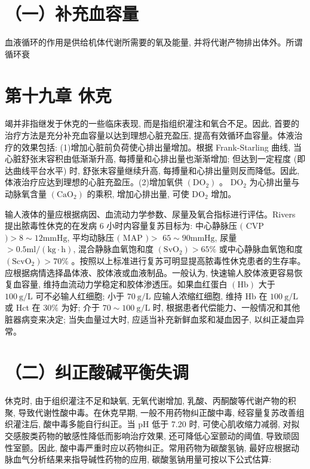 \documentclass[10pt]{article}
\begin{document}
\section*{（一）补充血容量}
血液循环的作用是供给机体代谢所需要的氧及能量, 并将代谢产物排出体外。所谓循环衰

\section*{第十九章 休克}
竭并非指继发于休克的一些临床表现, 而是指组织灌注和氧合不足。因此, 首要的治疗方法是充分补充血容量以达到理想心脏充盈压, 提高有效循环血容量。体液治疗的效果包括: (1)增加心脏前负荷使心排出量增加。根据 Frank-Starling 曲线, 当心脏舒张末容积由低渐渐升高, 每搏量和心排出量也渐渐增加; 但达到一定程度 (即达曲线平台水平) 时, 舒张末容量继续升高, 每搏量和心排出量则反而降低。因此,体液治疗应达到理想的心脏充盈压。(2)增加氧供 $\left(\mathrm{DO}_{2}\right)$ 。 $\mathrm{DO}_{2}$ 为心排出量与动脉氧含量 $\left(\mathrm{CaO}_{2}\right)$ 的乘积, 增加心排出量, 可使 $\mathrm{DO}_{2}$ 增加。

输人液体的量应根据病因、血流动力学参数、尿量及氧合指标进行评估。Rivers 提出脓毒性休克的在发病 6 小时内容量复苏目标为: 中心静脉压 $($ CVP $)>8 \sim 12 \mathrm{mmHg}$, 平均动脉压 $($ MAP $)>$ $65 \sim 90 \mathrm{mmHg}$, 尿量 $>0.5 \mathrm{ml} /(\mathrm{kg} \cdot \mathrm{h})$, 混合静脉血氧饱和度 $\left(\mathrm{SvO}_{2}\right)>65 \%$ 或中心静脉血氧饱和度 $\left(\mathrm{ScvO}_{2}\right)>70 \%$ 。按照以上标准进行复苏可明显提高脓毒性休克患者的生存率。应根据病情选择晶体液、胶体液或血液制品。一般认为, 快速输人胶体液更容易恢复血容量, 维持血流动力学稳定和胶体渗透压。如果血红蛋白 $(\mathrm{Hb})$ 大于 $100 \mathrm{~g} / \mathrm{L}$ 可不必输人红细胞; 小于 $70 \mathrm{~g} / \mathrm{L}$ 应输人浓缩红细胞, 维持 $\mathrm{Hb}$ 在 $100 \mathrm{~g} / \mathrm{L}$ 或 Hct 在 $30 \%$ 为好; 介于 $70 \sim 100 \mathrm{~g} / \mathrm{L}$ 时, 根据患者代偿能力、一般情况和其他脏器病变来决定; 当失血量过大时, 应适当补充新鲜血浆和凝血因子, 以纠正凝血异常。

\section*{（二）纠正酸碱平衡失调}
休克时, 由于组织灌注不足和缺氧, 无氧代谢增加, 乳酸、丙酮酸等代谢产物的积聚, 导致代谢性酸中毒。在休克早期, 一般不用药物纠正酸中毒, 经容量复苏改善组织灌注后, 酸中毒多能自行纠正。当 $\mathrm{pH}$ 低于 7.20 时, 可使心肌收缩力减弱, 对拟交感胺类药物的敏感性降低而影响治疗效果, 还可降低心室颤动的阈值, 导致顽固性室颤。因此, 酸中毒严重时应以药物纠正。常用药物为碳酸氢钠, 最好应根据动脉血气分析结果来指导碱性药物的应用, 碳酸氢钠用量可按以下公式估算:
\end{document}
